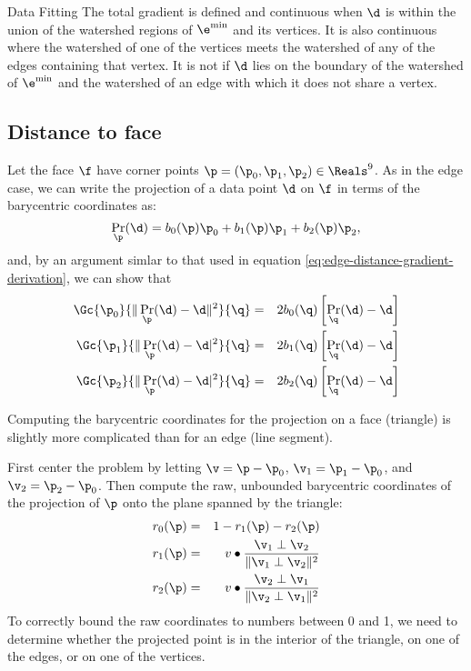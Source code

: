 \begin{plSection}{Data Fitting}
The total gradient is defined and continuous
when $\d$ is within the union of the watershed regions
of $\e^{\min}$ and its vertices.
It is also continuous where the watershed of one of the vertices
meets the watershed of any of the edges containing that vertex.
It is not if $\d$ lies on the boundary of the
watershed of $\e^{\min}$ and the watershed of an
edge with which it does not share a vertex.

\subsection{Distance to face}
\label{sec:Distance-to-face}

Let the face $\f$ have corner points $\p = (\p_0, \p_1, \p_2) \in \Reals^9$.
As in the edge case,
we can write the projection of a data point $\d$ on $\f$
in terms of the barycentric coordinates as:
\begin{equation}
\Pr_\p (\d) = b_0(\p) \p_0 + b_1(\p) \p_1 + b_2(\p) \p_2,
\end{equation}
and, by an argument simlar to that used in
equation \ref{eq:edge-distance-gradient-derivation},
we can show that
\begin{eqnarray}
\label{eq:face-distance-gradient}
\Gc{\p_0}{ \| \Pr_{\p} (\d) - \d \|^2 }{\q}
& = & 2 b_0(\q) \left[ \Pr_{\q} (\d) - \d \right]
\\
\Gc{\p_1}{ \| \Pr_{\p} (\d) - \d|^2 }{\q}
& = & 2 b_1(\q) \left[ \Pr_\q (\d) - \d \right]
\nonumber
\\
\Gc{\p_2}{ \| \Pr_{\p} (\d) - \d|^2 }{\q}
& = & 2 b_2(\q) \left[ \Pr_\q (\d) - \d \right]
\nonumber
\end{eqnarray}

Computing the barycentric coordinates for the projection
on a face (triangle) is slightly more complicated than
for an edge (line segment).

First center the problem by letting
$\v = \p - \p_0$,
$\v_1 = \p_1 - \p_0$, and $\v_2 = \p_2 - \p_0$.
Then compute the raw, unbounded barycentric coordinates
of the projection of $\p$ onto the plane
spanned by the triangle:
\begin{eqnarray}
r_0(\p) & = & 1 - r_1(\p) - r_2(\p)
\\
r_1(\p) & = & v \bullet {{\v_1 \perp \v_2} \over {\| \v_1 \perp \v_2 \|^2} }
\nonumber
\\
r_2(\p) & = & v \bullet {{\v_2 \perp \v_1} \over {\| \v_2 \perp \v_1 \|^2} }
\nonumber
\end{eqnarray}
To correctly bound the raw coordinates to numbers between 0 and 1,
we need to determine whether the projected point is in
the interior of the triangle, on one of the edges,
or on one of the vertices.


\end{plSection}
